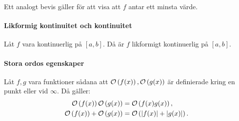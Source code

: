 Ett analogt bevis gäller för att visa att $f$ antar ett minsta värde.

\paragraph{Likformig kontinuitet och kontinuitet}
Låt $f$ vara kontinuerlig på $[a, b]$. Då är $f$ likformigt kontinuerlig på $[a, b]$.

\proof

\paragraph{Stora ordos egenskaper}
Låt $f, g$ vara funktioner sådana att $\mathcal{O}\left(f(x)\right), \mathcal{O}\left(g(x)\right)$ är definierade kring en punkt eller vid $\infty$. Då gäller:
\begin{align*}
	\mathcal{O}\left(f(x)\right)\mathcal{O}\left(g(x)\right)    &= \mathcal{O}\left(f(x)g(x)\right), \\
	\mathcal{O}\left(f(x)\right) + \mathcal{O}\left(g(x)\right) &= \mathcal{O}\left(\abs{f(x)} + \abs{g(x)}\right).
\end{align*}

\proof